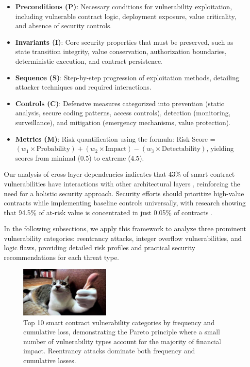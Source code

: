 \begin{itemize}
\item \textbf{Preconditions (P)}: Necessary conditions for vulnerability exploitation, including vulnerable contract logic, deployment exposure, value criticality, and absence of security controls.
\item \textbf{Invariants (I)}: Core security properties that must be preserved, such as state transition integrity, value conservation, authorization boundaries, deterministic execution, and contract persistence.
\item \textbf{Sequence (S)}: Step-by-step progression of exploitation methods, detailing attacker techniques and required interactions.
\item \textbf{Controls (C)}: Defensive measures categorized into prevention (static analysis, secure coding patterns, access controls), detection (monitoring, surveillance), and mitigation (emergency mechanisms, value protection).
\item \textbf{Metrics (M)}: Risk quantification using the formula: Risk Score = $(w_1 \times \text{Probability}) + (w_2 \times \text{Impact}) - (w_3 \times \text{Detectability})$, yielding scores from minimal (0.5) to extreme (4.5).
\end{itemize}

Our analysis of cross-layer dependencies indicates that 43\% of smart contract vulnerabilities have interactions with other architectural layers \cite{praitheeshan2019systematic}, reinforcing the need for a holistic security approach. Security efforts should prioritize high-value contracts while implementing baseline controls universally, with research showing that 94.5\% of at-risk value is concentrated in just 0.05\% of contracts \cite{perez2021analysis}.

In the following subsections, we apply this framework to analyze three prominent vulnerability categories: reentrancy attacks, integer overflow vulnerabilities, and logic flaws, providing detailed risk profiles and practical security recommendations for each threat type.


\begin{figure}[H]
\centering
\includegraphics[width=0.4\textwidth]{../figure/fig2.png}
\caption{Top 10 smart contract vulnerability categories by frequency and cumulative loss, demonstrating the Pareto principle where a small number of vulnerability types account for the majority of financial impact. Reentrancy attacks dominate both frequency and cumulative losses.}
\label{fig:smart_contract_pareto}
\end{figure}